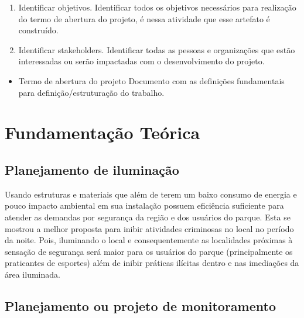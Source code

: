 \begin{enumerate}
	\item Identificar objetivos. 
		Identificar todos os objetivos necessários para realização do termo de abertura do projeto, é nessa atividade que esse artefato é construído.
	\item Identificar stakeholders.
		Identificar todas as pessoas e organizações que estão interessadas ou serão impactadas com o desenvolvimento do projeto. 
\end{enumerate}

\begin{itemize}
	\item Termo de abertura do projeto
	Documento com as definições fundamentais para definição/estruturação do trabalho. 
\end{itemize}

\section{Fundamenta\c{c}\~ao Te\'orica}

\subsection{Planejamento de ilumina\c{c}\~ao}

Usando estruturas e materiais que al\'em de terem um baixo consumo de energia e pouco impacto ambiental em sua instala\c{c}\~ao possuem efici\^encia suficiente para atender as demandas por seguran\c{c}a da regi\~ao e dos usu\'arios do parque. Esta se mostrou a melhor proposta para  inibir atividades criminosas no local no per\'iodo da noite. Pois, iluminando o local e consequentemente as localidades pr\'oximas \`a sensa\c{c}\~ao de seguran\c{c}a ser\'a maior para os usu\'arios do parque (principalmente os praticantes de esportes) al\'em de inibir pr\'aticas il\'icitas dentro e nas imedia\c{c}\~oes da \'area iluminada.

\subsection{Planejamento ou projeto de monitoramento}

